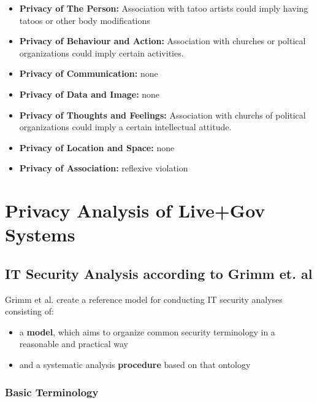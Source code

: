 \begin{itemize}

\item
  \textbf{Privacy of The Person:} Association with tatoo artists could
  imply having tatoos or other body modifications
\item
  \textbf{Privacy of Behaviour and Action:} Association with churches or
  poltical organizations could imply certain activities.
\item
  \textbf{Privacy of Communication:} none
\item
  \textbf{Privacy of Data and Image:} none
\item
  \textbf{Privacy of Thoughts and Feelings:} Association with churchs of
  political organizations could imply a certain intellectual attitude.
\item
  \textbf{Privacy of Location and Space:} none
\item
  \textbf{Privacy of Association:} reflexive violation
\end{itemize}




\pagebreak

\chapter{Privacy Analysis of Live+Gov Systems}

\section{IT Security Analysis according to Grimm et. al}

Grimm et al. create a reference model for conducting IT security
analyses consisting of:

\begin{itemize}

\item
  a \textbf{model}, which aims to organize common security
  terminology in a reasonable and practical way
\item
  and a systematic analysis \textbf{procedure} based on that ontology
\end{itemize}

\subsection{Basic Terminology}

